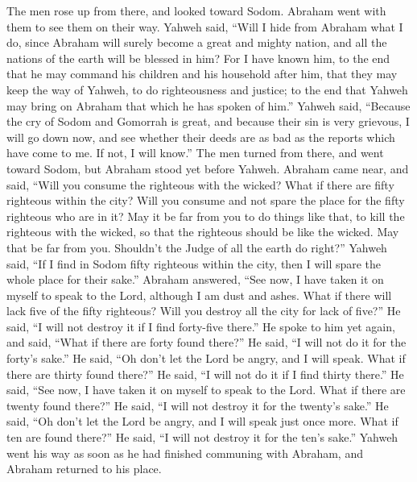  The men rose up from there, and looked toward Sodom.
Abraham went with them to see them on their way.  Yahweh
said, ``Will I hide from Abraham what I do,  since
Abraham will surely become a great and mighty nation, and all the
nations of the earth will be blessed in him?  For I have
known him, to the end that he may command his children and his household
after him, that they may keep the way of Yahweh, to do righteousness and
justice; to the end that Yahweh may bring on Abraham that which he has
spoken of him.''  Yahweh said, ``Because the cry of Sodom
and Gomorrah is great, and because their sin is very grievous,
 I will go down now, and see whether their deeds are as
bad as the reports which have come to me. If not, I will know.''
 The men turned from there, and went toward Sodom, but
Abraham stood yet before Yahweh.  Abraham came near, and
said, ``Will you consume the righteous with the wicked? 
What if there are fifty righteous within the city? Will you consume and
not spare the place for the fifty righteous who are in it?
 May it be far from you to do things like that, to kill
the righteous with the wicked, so that the righteous should be like the
wicked. May that be far from you. Shouldn't the Judge of all the earth
do right?''  Yahweh said, ``If I find in Sodom fifty
righteous within the city, then I will spare the whole place for their
sake.''  Abraham answered, ``See now, I have taken it on
myself to speak to the Lord, although I am dust and ashes.
 What if there will lack five of the fifty righteous?
Will you destroy all the city for lack of five?'' He said, ``I will not
destroy it if I find forty-five there.''  He spoke to him
yet again, and said, ``What if there are forty found there?'' He said,
``I will not do it for the forty's sake.''  He said, ``Oh
don't let the Lord be angry, and I will speak. What if there are thirty
found there?'' He said, ``I will not do it if I find thirty there.''
 He said, ``See now, I have taken it on myself to speak
to the Lord. What if there are twenty found there?'' He said, ``I will
not destroy it for the twenty's sake.''  He said, ``Oh
don't let the Lord be angry, and I will speak just once more. What if
ten are found there?'' He said, ``I will not destroy it for the ten's
sake.''  Yahweh went his way as soon as he had finished
communing with Abraham, and Abraham returned to his place.


